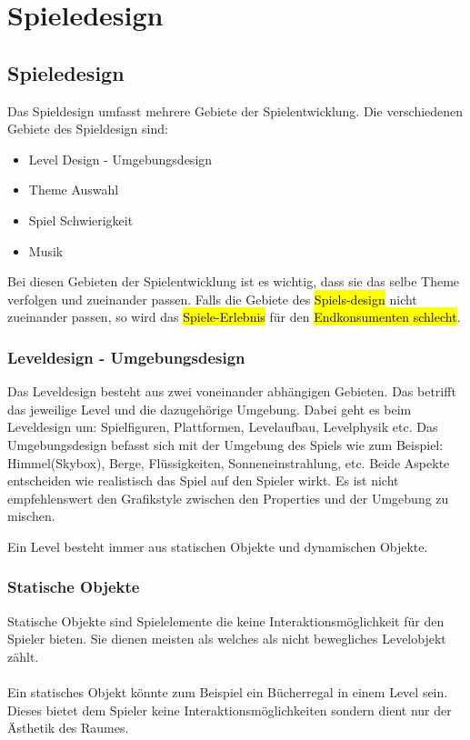 \pagebreak
{}
\chapter{Spieledesign}
\section{Spieledesign} %

Das Spieldesign umfasst mehrere Gebiete der Spielentwicklung. Die verschiedenen Gebiete des Spieldesign sind:

\begin{itemize} %
    \item Level Design - Umgebungsdesign 
    \item Theme Auswahl 
    \item Spiel Schwierigkeit 
    \item Musik
\end{itemize}

Bei diesen Gebieten der Spielentwicklung ist es wichtig, dass sie das selbe Theme verfolgen und zueinander passen. Falls die Gebiete des \hl{Spiels-design} nicht zueinander passen, so wird das \hl{Spiele-Erlebnis} für den \hl{Endkonsumenten schlecht}. 

\subsection{Leveldesign - Umgebungsdesign}
Das Leveldesign besteht aus zwei voneinander abhängigen Gebieten. 
Das betrifft das jeweilige Level und die dazugehörige Umgebung. Dabei geht es beim Leveldesign um: Spielfiguren, Plattformen, Levelaufbau, Levelphysik etc. 
Das Umgebungsdesign befasst sich mit der Umgebung des Spiels wie zum Beispiel: Himmel(Skybox), Berge, Flüssigkeiten, Sonneneinstrahlung, etc. 
Beide Aspekte entscheiden wie realistisch das Spiel auf den Spieler wirkt. Es ist nicht empfehlenswert den Grafikstyle zwischen den Properties und der Umgebung zu mischen.

Ein Level besteht immer aus statischen Objekte und dynamischen Objekte. 

\pagebreak

\subsection{Statische Objekte}
Statische Objekte sind Spielelemente die keine Interaktionsmöglichkeit für den Spieler bieten. Sie dienen meisten als  welches als nicht bewegliches Levelobjekt zählt. \\\\
Ein statisches Objekt könnte zum Beispiel ein Bücherregal in einem Level sein. Dieses bietet dem Spieler keine Interaktionsmöglichkeiten sondern dient nur der Ästhetik des Raumes. \\

